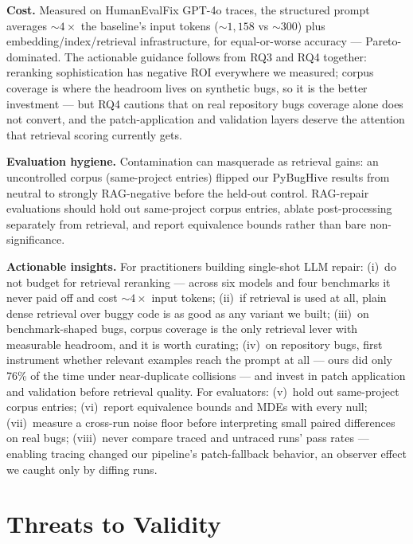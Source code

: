 \documentclass[10pt,conference]{IEEEtran}
\begin{document}
\textbf{Cost.} Measured on HumanEvalFix GPT-4o traces, the structured
prompt averages ${\sim}4\times$ the baseline's input tokens
(${\sim}1{,}158$ vs ${\sim}300$) plus embedding/index/retrieval
infrastructure, for equal-or-worse accuracy --- Pareto-dominated. The
actionable guidance follows from RQ3 and RQ4 together: reranking
sophistication has negative ROI everywhere we measured; corpus coverage is
where the headroom lives on synthetic bugs, so it is the better investment
--- but RQ4 cautions that on real repository bugs coverage alone does not
convert, and the patch-application and validation layers deserve the
attention that retrieval scoring currently gets.

\textbf{Evaluation hygiene.} Contamination can masquerade as retrieval
gains: an uncontrolled corpus (same-project entries) flipped our PyBugHive
results from neutral to strongly RAG-negative before the held-out control.
RAG-repair evaluations should hold out same-project corpus entries, ablate
post-processing separately from retrieval, and report equivalence bounds
rather than bare non-significance.

\textbf{Actionable insights.} For practitioners building single-shot
LLM repair: (i)~do not budget for retrieval reranking --- across six models
and four benchmarks it never paid off and cost ${\sim}4\times$ input tokens;
(ii)~if retrieval is used at all, plain dense retrieval over buggy code is
as good as any variant we built; (iii)~on benchmark-shaped bugs, corpus
coverage is the only retrieval lever with measurable headroom, and it is
worth curating; (iv)~on repository bugs, first instrument whether relevant
examples reach the prompt at all --- ours did only 76\% of the time under
near-duplicate collisions --- and invest in patch application and
validation before retrieval quality. For evaluators: (v)~hold out
same-project corpus entries; (vi)~report equivalence bounds and MDEs with
every null; (vii)~measure a cross-run noise floor before interpreting
small paired differences on real bugs; (viii)~never compare traced and
untraced runs' pass rates --- enabling tracing changed our pipeline's
patch-fallback behavior, an observer effect we caught only by diffing runs.

\section{Threats to Validity}
\label{sec:threats}
\end{document}
